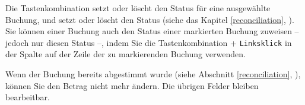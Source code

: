 Die Tastenkombination  setzt oder löscht den Status  für eine ausgewählte Buchung, und  setzt oder löscht den Status  (siehe das Kapitel \vref{reconciliation}, ). Sie können einer Buchung auch den Status einer markierten Buchung zuweisen – jedoch nur diesen Status –, indem Sie die Tastenkombination  + \texttt{Linksklick} in der Spalte  auf der Zeile der zu markierenden Buchung verwenden.

Wenn der Buchung bereits abgestimmt wurde (siehe Abschnitt \vref{reconciliation}, ), können Sie den Betrag nicht mehr ändern. Die übrigen Felder bleiben bearbeitbar.

